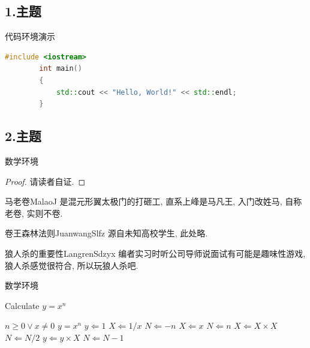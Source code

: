 \documentclass[12pt,aspectratio=169]{beamer}
\begin{document}
\subsection{1.主题}

\begin{frame}[fragile]{代码环境演示}
	\begin{lstlisting}[language=c++]
        #include <iostream>
        int main()
        {
            std::cout << "Hello, World!" << std::endl;
        }  
    \end{lstlisting}
\end{frame}

\subsection{2.主题}

\begin{frame}{数学环境}
	\begin{proof}{}
		请读者自证.
	\end{proof}
	\begin{definition}{马老卷}{MalaoJ}
		是混元形翼太极门的打砸工, 直系上峰是马凡王, 入门改姓马, 自称老卷, 实则不卷.
	\end{definition}
	\begin{lemma}{卷王森林法则}{JuanwangSlfz}
		源自未知高校学生, 此处略.
	\end{lemma}
	\begin{corollary}{狼人杀的重要性}{LangrenSdzyx}
		编者实习时听公司导师说面试有可能是趣味性游戏, 狼人杀感觉很符合, 所以玩狼人杀吧.
	\end{corollary}
\end{frame}


\begin{frame} {数学环境}
\begin{algorithm}[H]                           %
\caption{Calculate $y = x^n$}          %
\label{alg1}      %
\begin{algorithmic}  %
\REQUIRE $n \geq 0 \vee x \neq 0$
\ENSURE $y = x^n$
\STATE $y \Leftarrow 1$
\STATE $X \Leftarrow 1 / x$
\STATE $N \Leftarrow -n$
\ELSE
\STATE $X \Leftarrow x$
\STATE $N \Leftarrow n$
\ENDIF
{}
\STATE $X \Leftarrow X \times X$
\STATE $N \Leftarrow N / 2$
\ELSE[$N$ is odd]
\STATE $y \Leftarrow y \times X$
\STATE $N \Leftarrow N - 1$
\ENDIF
\ENDWHILE
\end{algorithmic}
\end{algorithm}
\end{frame}
\end{document}
